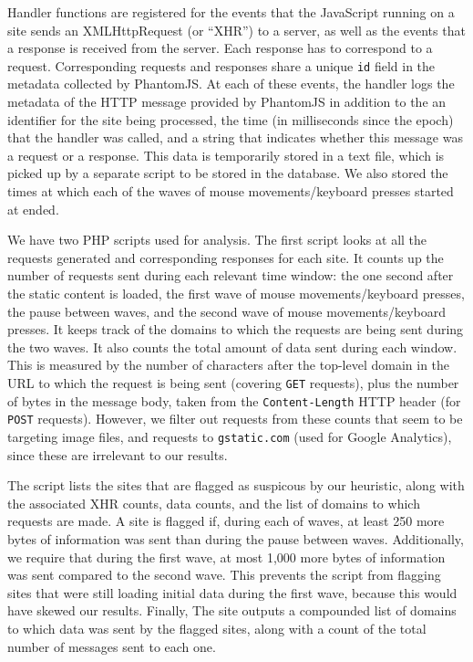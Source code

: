 \documentclass[letterpaper,twocolumn,10pt]{article}
\begin{document}
Handler functions are registered for the events that the JavaScript running on a site sends an XMLHttpRequest (or ``XHR'') to a server, as well as the events that a response is received from the server. Each response has to correspond to a request. Corresponding requests and responses share a unique {\tt id} field in the metadata collected by PhantomJS. At each of these events, the handler logs the metadata of the HTTP message provided by PhantomJS in addition to the an identifier for the site being processed, the time (in milliseconds since the epoch) that the handler was called, and a string that indicates whether this message was a request or a response. This data is temporarily stored in a text file, which is picked up by a separate script to be stored in the database. We also stored the times at which each of the waves of mouse movements/keyboard presses started at ended.

We have two PHP scripts used for analysis. The first script looks at all the requests generated and corresponding responses for each site. It counts up the number of requests sent during each relevant time window: the one second after the static content is loaded, the first wave of mouse movements/keyboard presses, the pause between waves, and the second wave of mouse movements/keyboard presses. It keeps track of the domains to which  the requests are being sent during the two waves. It also counts the total amount of data sent during each window. This is measured by the number of characters after the top-level domain in the URL to which the request is being sent (covering {\tt GET} requests), plus the number of bytes in the message body, taken from the {\tt Content-Length} HTTP header (for {\tt POST} requests). However, we filter out requests from these counts that seem to be targeting image files, and requests to {\tt gstatic.com} (used for Google Analytics), since these are irrelevant to our results.

The script lists the sites that are flagged as suspicous by our heuristic, along with the associated XHR counts, data counts, and the list of domains to which requests are made. A site is flagged if, during each of waves, at least 250 more bytes of information was sent than during the pause between waves. Additionally, we require that during the first wave, at most 1,000 more bytes of information was sent compared to the second wave. This prevents the script from flagging sites that were still loading initial data during the first wave, because this would have skewed our results. Finally, The site outputs a compounded list of domains to which data was sent by the flagged sites, along with a count of the total number of messages sent to each one.
\end{document}
